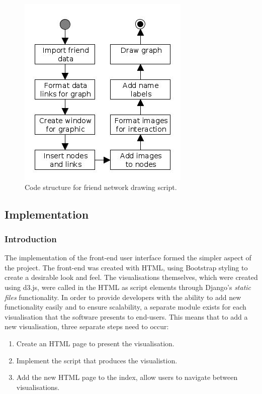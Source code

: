 \documentclass[12pt,onecolumn]{article}
\begin{document}
	\begin{figure}[h]
		\centering
		\includegraphics[scale=1]{network}
		\caption{Code structure for friend network drawing script.}
	\end{figure}
	
	\subsection{Implementation} %
	
	\subsubsection{Introduction}
	The implementation of the front-end user interface formed the simpler aspect of the project. The front-end was created with HTML, using Bootstrap styling to create a desirable look and feel. The visualisations themselves, which were created using d3.js, were called in the HTML as script elements through Django's \textit{static files} functionality. 
	In order to provide developers with the ability to add new functionality easily and to ensure scalability, a separate module exists for each visualisation that the software presents to end-users. This means that to add a new visualisation, three separate steps need to occur:
	
	\begin{enumerate}
		\item Create an HTML page to present the visualisation.
		\item Implement the script that produces the visualistion.
		\item Add the new HTML page to the index, allow users to navigate between visualisations.
	\end{enumerate}
	
\end{document}
